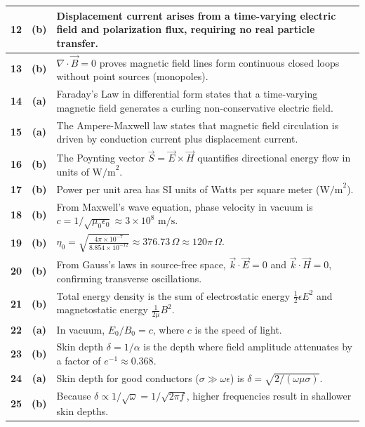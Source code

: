 {\begin{tabularx}{\textwidth}{|c|c|X|}
\textbf{12} & \textbf{(b)} & Displacement current arises from a time-varying electric field and polarization flux, requiring no real particle transfer. \\ \hline
\textbf{13} & \textbf{(b)} & $\nabla \cdot \vec{B} = 0$ proves magnetic field lines form continuous closed loops without point sources (monopoles). \\ \hline
\textbf{14} & \textbf{(a)} & Faraday's Law in differential form states that a time-varying magnetic field generates a curling non-conservative electric field. \\ \hline
\textbf{15} & \textbf{(a)} & The Ampere-Maxwell law states that magnetic field circulation is driven by conduction current plus displacement current. \\ \hline
\textbf{16} & \textbf{(b)} & The Poynting vector $\vec{S} = \vec{E} \times \vec{H}$ quantifies directional energy flow in units of $\text{W/m}^2$. \\ \hline
\textbf{17} & \textbf{(b)} & Power per unit area has SI units of Watts per square meter ($\text{W/m}^2$). \\ \hline
\textbf{18} & \textbf{(b)} & From Maxwell's wave equation, phase velocity in vacuum is $c = 1/\sqrt{\mu_0 \epsilon_0} \approx 3 \times 10^8\text{ m/s}$. \\ \hline
\textbf{19} & \textbf{(b)} & $\eta_0 = \sqrt{\frac{4\pi \times 10^{-7}}{8.854 \times 10^{-12}}} \approx 376.73\,\Omega \approx 120\pi\,\Omega$. \\ \hline
\textbf{20} & \textbf{(b)} & From Gauss's laws in source-free space, $\vec{k} \cdot \vec{E} = 0$ and $\vec{k} \cdot \vec{H} = 0$, confirming transverse oscillations. \\ \hline
\textbf{21} & \textbf{(b)} & Total energy density is the sum of electrostatic energy $\frac{1}{2}\epsilon E^2$ and magnetostatic energy $\frac{1}{2\mu} B^2$. \\ \hline
\textbf{22} & \textbf{(a)} & In vacuum, $E_0 / B_0 = c$, where $c$ is the speed of light. \\ \hline
\textbf{23} & \textbf{(b)} & Skin depth $\delta = 1/\alpha$ is the depth where field amplitude attenuates by a factor of $e^{-1} \approx 0.368$. \\ \hline
\textbf{24} & \textbf{(a)} & Skin depth for good conductors ($\sigma \gg \omega\epsilon$) is $\delta = \sqrt{2/(\omega \mu \sigma)}$. \\ \hline
\textbf{25} & \textbf{(b)} & Because $\delta \propto 1/\sqrt{\omega} = 1/\sqrt{2\pi f}$, higher frequencies result in shallower skin depths. \\ \hline
\end{tabularx}
}

